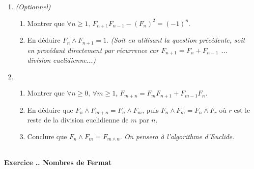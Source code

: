 \documentclass{article}
\newcounter{exo}
\newcommand{\exercice}[1][\null]{\textbf{\\ Exercice \thesection.\theexo. #1} \addtocounter{exo}{1}}
\begin{document}
\begin{enumerate}

    \item \emph{(Optionnel)} \begin{enumerate}\item Montrer que $\forall n \ge 1$, $F_{n+1} F_{n-1} - (F_n)^2 = (-1)^n$.

        \item En déduire $F_n \wedge F_{n+1} = 1$. \emph{(Soit en utilisant la
                question précédente, soit en procédant directement 
                par récurrence car $F_{n+1} = F_n + F_{n-1}$ ... division
                euclidienne...)}
\end{enumerate}

\item \begin{enumerate}

\item Montrer que $\forall n \ge 0$, $\forall m \ge 1$, $F_{m+n} = F_m F_{n+1} + F_{m-1} F_n$.

\item En déduire que $F_n \wedge F_{m+n} = F_n \wedge F_m$, puis $F_n \wedge F_{m} = F_n \wedge F_r$ où $r$ est le reste de la division euclidienne de $m$ par $n$.

\item Conclure que $F_n \wedge F_{m} = F_{m \wedge n}$. \emph{On pensera à l'algorithme d'Euclide.}

\end{enumerate}

\end{enumerate}




\exercice[Nombres de Fermat]
\end{document}
